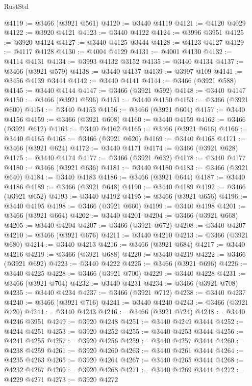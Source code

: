 \begin{lexlean}{RustStd}
\begin{coremodule}
@4119 := @3466 (@3921 @561)
@4120 := @3440 @4119
@4121 := @4120 @4029
@4122 := @3920 @4121
@4123 := @3440 @4122
@4124 := @3996 @3951
@4125 := @3920 @4124
@4127 := @3440 @4125 @3444
@4128 := @4123 @4127
@4129 := @4117 @4128
@4130 := @4004 @4129
@4131 := @4001 @4130
@4132 := @4114 @4131
@4134 := @3993 @4132 @3152
@4135 := @3440 @4134
@4137 := @3466 (@3921 @579)
@4138 := @3440 @4137
@4139 := @3997 @109
@4141 := @3456 @4139 @3444
@4142 := @3440 @4141
@4144 := @3466 (@3921 @588)
@4145 := @3440 @4144
@4147 := @3466 (@3921 @592)
@4148 := @3440 @4147
@4150 := @3466 (@3921 @596)
@4151 := @3440 @4150
@4153 := @3466 (@3921 @600)
@4154 := @3440 @4153
@4156 := @3466 (@3921 @604)
@4157 := @3440 @4156
@4159 := @3466 (@3921 @608)
@4160 := @3440 @4159
@4162 := @3466 (@3921 @612)
@4163 := @3440 @4162
@4165 := @3466 (@3921 @616)
@4166 := @3440 @4165
@4168 := @3466 (@3921 @620)
@4169 := @3440 @4168
@4171 := @3466 (@3921 @624)
@4172 := @3440 @4171
@4174 := @3466 (@3921 @628)
@4175 := @3440 @4174
@4177 := @3466 (@3921 @632)
@4178 := @3440 @4177
@4180 := @3466 (@3921 @636)
@4181 := @3440 @4180
@4183 := @3466 (@3921 @640)
@4184 := @3440 @4183
@4186 := @3466 (@3921 @644)
@4187 := @3440 @4186
@4189 := @3466 (@3921 @648)
@4190 := @3440 @4189
@4192 := @3466 (@3921 @652)
@4193 := @3440 @4192
@4195 := @3466 (@3921 @656)
@4196 := @3440 @4195
@4198 := @3466 (@3921 @660)
@4199 := @3440 @4198
@4201 := @3466 (@3921 @664)
@4202 := @3440 @4201
@4204 := @3466 (@3921 @668)
@4205 := @3440 @4204
@4207 := @3466 (@3921 @672)
@4208 := @3440 @4207
@4210 := @3466 (@3921 @676)
@4211 := @3440 @4210
@4213 := @3466 (@3921 @680)
@4214 := @3440 @4213
@4216 := @3466 (@3921 @684)
@4217 := @3440 @4216
@4219 := @3466 (@3921 @688)
@4220 := @3440 @4219
@4222 := @3466 (@3921 @692)
@4223 := @3440 @4222
@4225 := @3466 (@3921 @696)
@4226 := @3440 @4225
@4228 := @3466 (@3921 @700)
@4229 := @3440 @4228
@4231 := @3466 (@3921 @704)
@4232 := @3440 @4231
@4234 := @3466 (@3921 @708)
@4235 := @3440 @4234
@4237 := @3466 (@3921 @712)
@4238 := @3440 @4237
@4240 := @3466 (@3921 @716)
@4241 := @3440 @4240
@4243 := @3466 (@3921 @720)
@4244 := @3440 @4243
@4246 := @3466 (@3921 @724)
@4248 := @3440 @4246 @3951
@4249 := @3920 @4248
@4251 := @3440 @4249 @3444
@4252 := @4244 @4251
@4253 := @3920 @4252
@4255 := @3440 @4253 @3444
@4256 := @4241 @4255
@4257 := @3920 @4256
@4259 := @3440 @4257 @3444
@4260 := @4238 @4259
@4261 := @3920 @4260
@4263 := @3440 @4261 @3444
@4264 := @4235 @4263
@4265 := @3920 @4264
@4267 := @3440 @4265 @3444
@4268 := @4232 @4267
@4269 := @3920 @4268
@4271 := @3440 @4269 @3444
@4272 := @4229 @4271
@4273 := @3920 @4272

\end{coremodule}
\end{lexlean}
